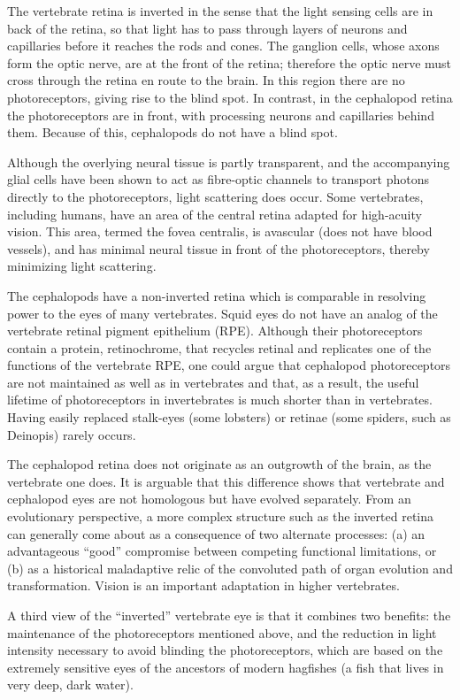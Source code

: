 \documentclass[]{book}
\begin{document}
The vertebrate retina is inverted in the sense that the light sensing cells are in back of the retina, so that light has to pass through layers of neurons and capillaries before it reaches the rods and cones. The ganglion cells, whose axons form the optic nerve, are at the front of the retina; therefore the optic nerve must cross through the retina en route to the brain. In this region there are no photoreceptors, giving rise to the blind spot. In contrast, in the cephalopod retina the photoreceptors are in front, with processing neurons and capillaries behind them. Because of this, cephalopods do not have a blind spot.

Although the overlying neural tissue is partly transparent, and the accompanying glial cells have been shown to act as fibre-optic channels to transport photons directly to the photoreceptors, light scattering does occur. Some vertebrates, including humans, have an area of the central retina adapted for high-acuity vision. This area, termed the fovea centralis, is avascular (does not have blood vessels), and has minimal neural tissue in front of the photoreceptors, thereby minimizing light scattering.

The cephalopods have a non-inverted retina which is comparable in resolving power to the eyes of many vertebrates. Squid eyes do not have an analog of the vertebrate retinal pigment epithelium (RPE). Although their photoreceptors contain a protein, retinochrome, that recycles retinal and replicates one of the functions of the vertebrate RPE, one could argue that cephalopod photoreceptors are not maintained as well as in vertebrates and that, as a result, the useful lifetime of photoreceptors in invertebrates is much shorter than in vertebrates. Having easily replaced stalk-eyes (some lobsters) or retinae (some spiders, such as Deinopis) rarely occurs.

The cephalopod retina does not originate as an outgrowth of the brain, as the vertebrate one does. It is arguable that this difference shows that vertebrate and cephalopod eyes are not homologous but have evolved separately. From an evolutionary perspective, a more complex structure such as the inverted retina can generally come about as a consequence of two alternate processes: (a) an advantageous ``good'' compromise between competing functional limitations, or (b) as a historical maladaptive relic of the convoluted path of organ evolution and transformation. Vision is an important adaptation in higher vertebrates.

A third view of the ``inverted'' vertebrate eye is that it combines two benefits: the maintenance of the photoreceptors mentioned above, and the reduction in light intensity necessary to avoid blinding the photoreceptors, which are based on the extremely sensitive eyes of the ancestors of modern hagfishes (a fish that lives in very deep, dark water).
\end{document}

